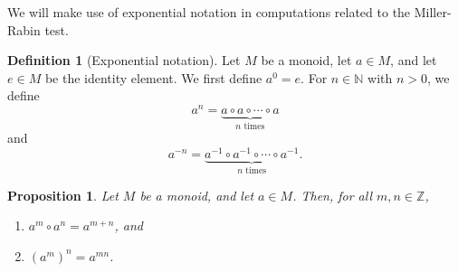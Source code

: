 \documentclass[10pt, titlepage]{amsart}
\newcommand\Z{{\mathbb Z}}
\newcommand\N{{\mathbb N}}
\newtheorem{prop}{Proposition}[subsection]
\theoremstyle{definition}
\newtheorem{definition}{Definition}[subsection]
\begin{document}
	We will make use of exponential notation in computations related to the Miller-Rabin test. 
	
	\begin{definition}[Exponential notation]\label{definition:exponential_notation}
		Let $M$ be a monoid, let $a \in M$, and let $e \in M$ be the identity element.
		We first define $a^0 = e$.
		For $n \in \N$ with $n>0$, we define 
		$$ a^n = \underbrace{a \circ a \circ \cdots \circ a}_{n \text{ times}}$$ and 
		$$ a^{-n} = \underbrace{a^{-1} \circ a^{-1} \circ \cdots \circ a^{-1}}_{n \text{ times}}.$$
	\end{definition}
	
	\begin{prop}
		Let $M$ be a monoid, and let $a \in M$. Then, for all $m,n \in \Z$,
		\begin{enumerate}
			\item $a^m \circ a^n = a^{m+n}$, and
			\item $(a^m)^n = a^{mn}$.
		\end{enumerate}
	\end{prop}
	
\end{document}
